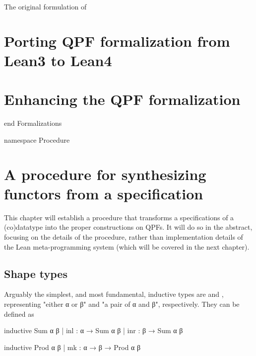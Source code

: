 \documentclass[titlepage]{report}
\newenvironment{leanhidden}{\expandafter\comment}{\expandafter\endcomment}
\begin{document}
The original formulation of 









\chapter{Porting QPF formalization from Lean3 to Lean4}
\label{ch:porting}




\chapter{Enhancing the QPF formalization}
\label{ch:enhancing}










\begin{leanhidden}
    end Formalizations

    namespace Procedure
\end{leanhidden}




\chapter{A procedure for synthesizing functors from a specification}
\label{ch:procedure}

This chapter will establish a procedure that transforms a specifications of a (co)datatype
into the proper constructions on QPFs.
It will do so in the abstract, focusing on the details of the procedure, rather than implementation
details of the Lean meta-programming system (which will be covered in the next chapter).


\section{Shape types}

Arguably the simplest, and most fundamental, inductive types are  and ,
representing "either α or β" and "a pair of α and β", respectively.
They can be defined as

\begin{center}
\begin{minipage}[t]{0.45\linewidth}
    \begin{leancode}
inductive Sum α β
  | inl : α → Sum α β
  | inr : β → Sum α β
    \end{leancode}
\end{minipage}
\begin{minipage}[t]{0.45\linewidth}
    \begin{leancode}    
inductive Prod α β
  | mk : α → β → Prod α β
    \end{leancode}
\end{minipage}
\end{center}
\end{document}
